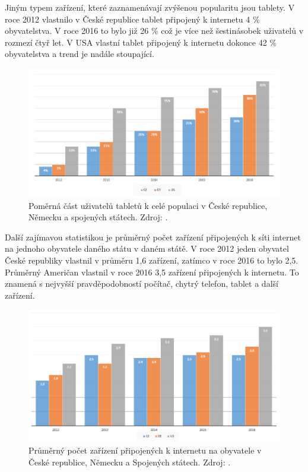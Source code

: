 Jiným typem zařízení, které zaznamenávají zvýšenou popularitu jsou tablety. V roce 2012 vlastnilo v České republice tablet připojený k internetu 4 \% obyvatelstva. V roce 2016 to bylo již 26 \% což je více než šestinásobek uživatelů v rozmezí čtyř let. V USA vlastní tablet připojený k internetu dokonce 42 \% obyvatelstva a trend je nadále stoupající. 

\begin{figure}[h!]\label{uzivateleTablet}
\centering
\includegraphics[width=13cm]{img/uzivateleTablet}
\caption{Poměrná část uživatelů tabletů k celé populaci v České republice, Německu a spojených státech. Zdroj: \cite{barometer}.} 
\end{figure}

Další zajímavou statistikou je průměrný počet zařízení připojených k síti internet na jednoho obyvatele daného státu v daném státě. V roce 2012 jeden obyvatel České republiky vlastnil v průměru 1,6 zařízení, zatímco v roce 2016 to bylo 2,5. Průměrný Američan vlastnil v roce 2016 3,5 zařízení připojených k internetu. To znamená s nejvyšší pravděpodobností počítač, chytrý telefon, tablet a další zařízení.

\begin{figure}[h!]\label{pocetZarizeni}
\centering
\includegraphics[width=13cm]{img/pocetZarizeni}
\caption{Průměrný počet zařízení připojených k internetu na obyvatele v České republice, Německu a Spojených státech. Zdroj: \cite{barometer}.} 
\end{figure}

